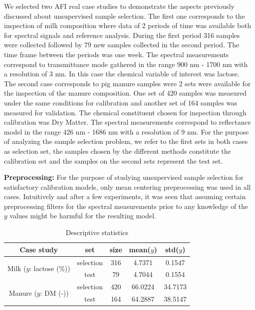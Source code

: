 \documentclass[journal=ancham,manuscript=article]{achemso}
\begin{document}
We selected two AFI real case studies to demonstrate the aspects previously discussed about unsupervised sample selection. The first one corresponds to the inspection of milk composition where data of 2 periods of time was available both for spectral signals and reference analysis. During the first period 316 samples were collected followed by 79 new samples collected in the second period. The time frame between the periods was one week. The spectral measurements correspond to transmittance mode gathered in the range 900 nm - 1700 nm with a resolution of 3 nm. In this case the chemical variable of interest was lactose. 
The second case corresponds to pig manure samples were 2 sets were available for the inspection of the manure composition. One set of 420 samples was measured under the same conditions for calibration and another set of 164 samples was measured for validation. The chemical constituent chosen for inspection through calibration was Dry Matter. The spectral measurements correspond to reflectance model in the range 426 nm - 1686 nm with a resolution of 9 nm.
For the purpose of analyzing the sample selection problem, we refer to the first sets in both cases as selection set, the samples chosen by the different methods constitute the calibration set and the samples on the second sets represent the test set. 

\textbf{Preprocessing:} For the purpose of studying unsupervised sample selection for satisfactory calibration models, only mean centering preprocessing was used in all cases. Intuitively and after a few experiments, it was seen that assuming certain preprocessing filters for the spectral measurements prior to any knowledge of the $y$ values might be harmful for the resulting model.

\begin{table}[t]
\centering
\begin{tabular}{|c|c|c|c|c|} 
\hline
Case study	& set & size & mean($y$) & std($y$)  	\\
\hline
\multirow{2}{10em}{Milk ($y$: lactose (\%))} & selection & 316 & 4.7371 & 0.1547\\
& test & 79 & 4.7044 & 0.1554\\
\hline
\multirow{2}{10em}{Manure ($y$: DM (-))} & selection & 420 & 66.0224 & 34.7173\\
& test & 164 & 64.2887 & 38.5147 \\
\hline 


\end{tabular}
\caption{Descriptive statistics}
\label{tab_descriptive_statistics}
\end{table}
\end{document}
